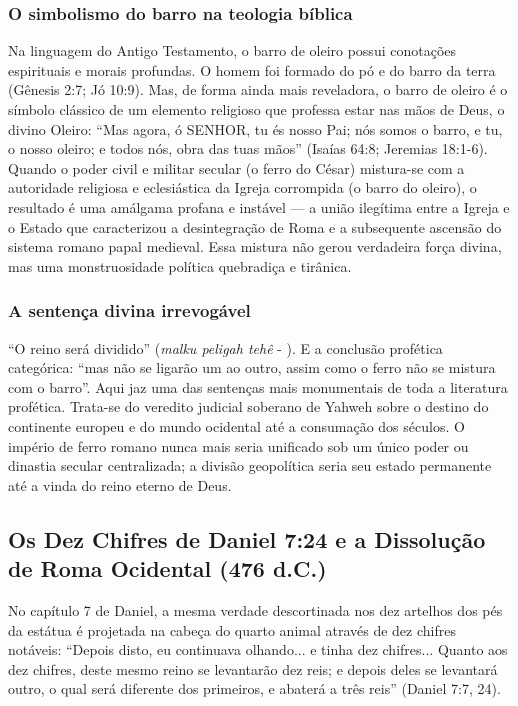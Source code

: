 \subsubsection*{O simbolismo do barro na teologia bíblica}
Na linguagem do Antigo Testamento, o barro de oleiro possui conotações espirituais e morais profundas. O homem foi formado do pó e do barro da terra (Gênesis 2:7; Jó 10:9). Mas, de forma ainda mais reveladora, o barro de oleiro é o símbolo clássico de um elemento religioso que professa estar nas mãos de Deus, o divino Oleiro: ``Mas agora, ó SENHOR, tu és nosso Pai; nós somos o barro, e tu, o nosso oleiro; e todos nós, obra das tuas mãos'' (Isaías 64:8; Jeremias 18:1-6).
Quando o poder civil e militar secular (o ferro do César) mistura-se com a autoridade religiosa e eclesiástica da Igreja corrompida (o barro do oleiro), o resultado é uma amálgama profana e instável — a união ilegítima entre a Igreja e o Estado que caracterizou a desintegração de Roma e a subsequente ascensão do sistema romano papal medieval. Essa mistura não gerou verdadeira força divina, mas uma monstruosidade política quebradiça e tirânica.


\subsubsection*{A sentença divina irrevogável}
``O reino será dividido'' (\textit{malku peligah tehê} - ). E a conclusão profética categórica: ``mas não se ligarão um ao outro, assim como o ferro não se mistura com o barro''.
Aqui jaz uma das sentenças mais monumentais de toda a literatura profética. Trata-se do veredito judicial soberano de Yahweh sobre o destino do continente europeu e do mundo ocidental até a consumação dos séculos. O império de ferro romano nunca mais seria unificado sob um único poder ou dinastia secular centralizada; a divisão geopolítica seria seu estado permanente até a vinda do reino eterno de Deus.


\subsection{Os Dez Chifres de Daniel 7:24 e a Dissolução de Roma Ocidental (476 d.C.)}


No capítulo 7 de Daniel, a mesma verdade descortinada nos dez artelhos dos pés da estátua é projetada na cabeça do quarto animal através de dez chifres notáveis:
``Depois disto, eu continuava olhando... e tinha dez chifres... Quanto aos dez chifres, deste mesmo reino se levantarão dez reis; e depois deles se levantará outro, o qual será diferente dos primeiros, e abaterá a três reis'' (Daniel 7:7, 24).


